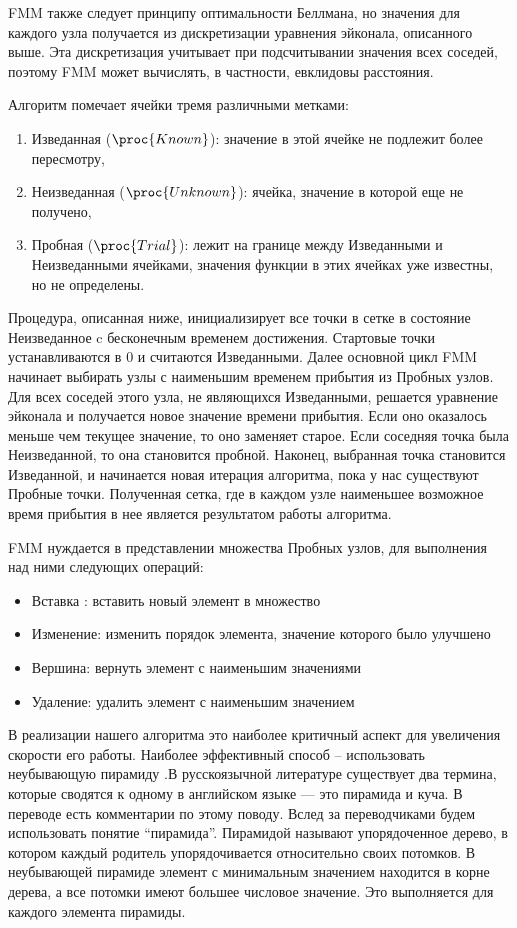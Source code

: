 \documentclass[a4paper,12pt]{article}
\begin{document}
FMM также следует принципу оптимальности Беллмана, но значения для
каждого узла получается из дискретизации уравнения эйконала,
описанного выше. Эта дискретизация учитывает при подсчитывании
значения всех соседей, поэтому FMM может вычислять, в частности,
евклидовы расстояния.

Алгоритм помечает ячейки тремя различными метками:
\begin{enumerate}
\item Изведанная ($\proc{Known}$): значение в этой ячейке не подлежит более
  пересмотру,
\item Неизведанная ($\proc{Unknown}$): ячейка, значение в которой еще не
  получено,
\item Пробная ($\proc{Trial}$): лежит на границе между Изведанными
  и Неизведанными ячейками, значения функции в этих ячейках
  уже известны, но не определены.
\end{enumerate}

Процедура, описанная ниже, инициализирует все точки в сетке в состояние
Неизведанное c бесконечным временем достижения. Стартовые
точки устанавливаются в $0$ и считаются Изведанными. Далее основной
цикл FMM начинает выбирать узлы с наименьшим временем прибытия из
Пробных узлов. Для всех соседей этого узла, не являющихся
Изведанными, решается уравнение эйконала и получается новое
значение времени прибытия. Если оно оказалось меньше чем текущее
значение, то оно заменяет старое. Если соседняя точка была
Неизведанной, то она становится пробной. Наконец, выбранная
точка становится Изведанной, и начинается новая итерация
алгоритма, пока у нас существуют Пробные точки. Полученная
сетка, где в каждом узле наименьшее возможное время прибытия в нее
является результатом работы алгоритма.

FMM нуждается в представлении множества Пробных узлов, для
выполнения над ними следующих операций:
\begin{itemize}
\item Вставка : вставить новый элемент в множество
\item Изменение: изменить порядок элемента, значение которого было
  улучшено
\item Вершина: вернуть элемент с наименьшим значениями
\item Удаление: удалить элемент с наименьшим значением 
\end{itemize}
В реализации нашего алгоритма это наиболее критичный аспект для
увеличения скорости его работы. Наиболее эффективный способ --
использовать неубывающую пирамиду \cite{K2017}.В русскоязычной
литературе существует два термина, которые сводятся к одному в
английском языке --- это пирамида и куча. В переводе \cite{K2017} есть
комментарии по этому поводу. Вслед за переводчиками будем использовать
понятие ``пирамида''. Пирамидой называют упорядоченное дерево, в
котором каждый родитель упорядочивается относительно своих потомков. В
неубывающей пирамиде элемент с минимальным значением находится в корне
дерева, а все потомки имеют большее числовое значение. Это выполняется
для каждого элемента пирамиды.
\end{document}
